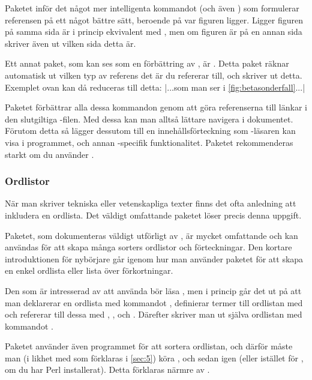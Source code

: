 \documentclass[lang=sv,ptsize=10pt,font=none,nomath,titles=bf,../../a4.tex]{subfiles}
\begin{document}
Paketet  inför det något mer intelligenta kommandot
 (och även ) som formulerar referensen på ett
något bättre sätt, beroende på var figuren ligger. Ligger figuren på samma
sida är  i princip ekvivalent med , men om figuren är
på en annan sida skriver  även ut vilken sida detta är.

Ett annat paket, som kan ses som en förbättring av , är
. Detta paket räknar automatisk ut vilken typ av referens
det är du refererar till, och skriver ut detta. Exemplet ovan kan då
reduceras till detta:
\latex|...som man ser i \cref{fig:betasonderfall}...|

Paketet  förbättrar alla dessa kommandon genom att
göra referenserna till länkar i den slutgiltiga \PDF-filen. Med dessa kan
man alltså lättare navigera i dokumentet. Förutom detta så lägger
 dessutom till en innehållsförteckning som \PDF-läsaren
kan visa i programmet, och annan \PDF-specifik funktionalitet. Paketet
rekommenderas starkt om du använder \pdfLaTeX.

\subsubsection{Ordlistor}\label{sec:2:glossaries}
När man skriver tekniska eller vetenskapliga texter finns det ofta
anledning att inkludera en ordlista. Det väldigt omfattande paketet
 löser precis denna uppgift.

Paketet, som dokumenteras väldigt utförligt av \textcite{Talbot13a},
är mycket omfattande och kan användas för att skapa många sorters
ordlistor och förteckningar. Den kortare introduktionen för nybörjare
\parencite{Talbot13b} går igenom hur man använder paketet för att skapa
en enkel ordlista eller lista över förkortningar.

Den som är intresserad av att använda  bör läsa 
\textcite{Talbot13b}, men i princip går det ut på att man deklarerar en
ordlista med kommandot , definierar termer till
ordlistan med  och refererar till dessa med
, ,  och . Därefter skriver man
ut själva ordlistan med kommandot .

Paketet använder även programmet  för att sortera ordlistan,
och därför måste man (i likhet med  som förklaras i
\cref{sec:5}) köra ,  och sedan 
igen (eller  istället för , om du har
Perl installerat). Detta förklaras närmre av
\textcite{Talbot13a,Talbot13b}.
\end{document}

